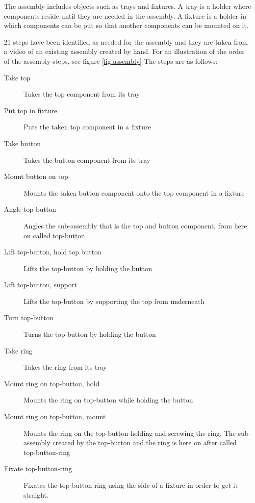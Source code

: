 The assembly includes objects such as trays and fixtures. A tray is a holder where components reside until they are needed in the assembly. A fixture is a holder in which components can be put so that another components can be mounted on it.

21 steps have been identified as needed for the assembly and they are taken from a video of an existing assembly created by hand. For an illustration of the order of the assembly steps, see figure \ref{fig:assembly} The steps are as follows:

\begin{description}
\item[Take top] Takes the top component from its tray

\item[Put top in fixture] Puts the taken top component in a fixture

\item[Take button] Takes the button component from its tray

\item[Mount button on top] Mounts the taken button component onto the top component in a fixture

\item[Angle top-button] Angles the sub-assembly that is the top and button component, from here on called top-button

\item[Lift top-button, hold top button] Lifts the top-button by holding the button

\item[Lift top-button, support] Lifts the top-button by supporting the top from underneath

\item[Turn top-button] Turns the top-button by holding the button

\item[Take ring] Takes the ring from its tray

\item[Mount ring on top-button, hold] Mounts the ring on top-button while holding the button

\item[Mount ring on top-button, mount] Mounts the ring on the top-button holding and screwing the ring. The sub-assembly created by the top-button and the ring is here on after called top-button-ring

\item[Fixate top-button-ring] Fixates the top-button ring using the side of a fixture in order to get it straight.


\end{description}
